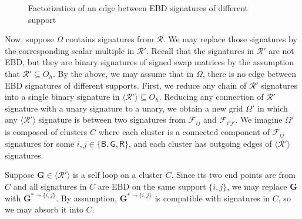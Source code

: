 \documentclass[11pt]{article}
\newcommand{\db}{\mathsf{B}}
\newcommand{\dg}{\mathsf{G}}
\newcommand{\dr}{\mathsf{R}}
\newcommand{\octgroup}{O_h}
\newcommand{\domres}[1]{
  ^{*\to\{#1\}}
}
\newcommand{\strspt}{\textsf{EBD}\xspace}
\begin{document}
\begin{figure}
  \centering
  \caption{Factorization of an edge between \strspt signatures of different support}\label{fig:support-factor}
\end{figure}

Now, suppose $\Omega$ contains signatures from $\mathcal{R}$.
We may replace those signatures by the corresponding scalar multiple in $\mathcal{R}'$.
Recall that the signatures in $\mathcal{R}'$ are not \strspt, but they are binary signatures of signed swap matrices by the assumption that $\mathcal{R}' \subseteq \octgroup$.
By the above, we may assume that in $\Omega$, there is no edge between \strspt signatures of different supports.
First, we reduce any chain of $\mathcal{R}'$ signatures into a single binary signature in $\langle \mathcal{R}' \rangle \subseteq \octgroup$.
Reducing any connection of $\mathcal{R}'$ signature with a unary signature to a unary, we obtain a new grid $\Omega'$ in which any $\langle \mathcal{R}' \rangle$ signature is between two signatures from $\mathcal{F}_{ij}$ and $\mathcal{F}_{i'j'}$.
We imagine $\Omega'$ is composed of clusters $C$ where each cluster is a connected component of $\mathcal{F}_{ij}$ signatures for some $i, j \in \{\db, \dg, \dr\}$, and each cluster has outgoing edges of $\langle \mathcal{R}' \rangle$ signatures.

Suppose $\mathbf{G} \in \langle \mathcal{R}' \rangle$ is a self loop on a cluster $C$.
Since its two end points are from $C$ and all signatures in $C$ are \strspt on the same support $\{i, j\}$, we may replace $\mathbf{G}$ with $\mathbf{G}\domres{i, j}$.
By assumption, $\mathbf{G}\domres{i, j}$ is compatible with signatures in $C$, so we may absorb it into $C$.
\end{document}
